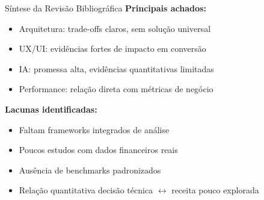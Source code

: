 \documentclass{beamer}
\begin{document}
    \begin{frame}{Síntese da Revisão Bibliográfica}
        \textbf{Principais achados:}

        \vspace{0.3cm}

        \begin{itemize}
            \item Arquitetura: trade-offs claros, sem solução universal
            \item UX/UI: evidências fortes de impacto em conversão
            \item IA: promessa alta, evidências quantitativas limitadas
            \item Performance: relação direta com métricas de negócio
        \end{itemize}

        \vspace{0.4cm}

        \textbf{Lacunas identificadas:}
        \begin{itemize}
            \item Faltam frameworks integrados de análise
            \item Poucos estudos com dados financeiros reais
            \item Ausência de benchmarks padronizados
            \item Relação quantitativa decisão técnica $\leftrightarrow$ receita pouco explorada
        \end{itemize}
    \end{frame}

\end{document}
